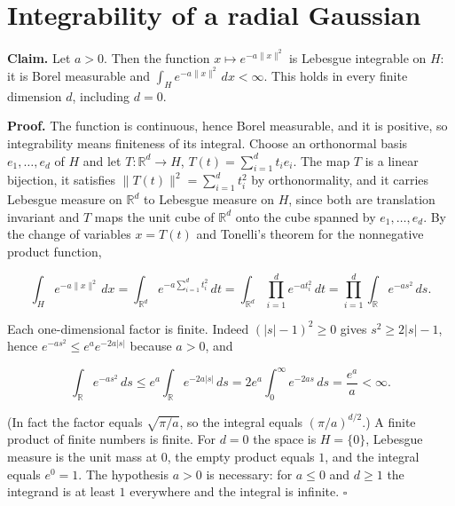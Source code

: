 \documentclass[11pt,a4paper]{article}
\begin{document}
\section{\texorpdfstring{Integrability of a radial Gaussian}{Integrability of a radial Gaussian}}


\textbf{Claim.} Let \(a>0\). Then the function \(x\mapsto e^{-a\|x\|^2}\) is Lebesgue integrable on \(H\): it is Borel measurable and \(\int_He^{-a\|x\|^2}\,dx<\infty\). This holds in every finite dimension \(d\), including \(d=0\).




\textbf{Proof.} The function is continuous, hence Borel measurable, and it is positive, so integrability means finiteness of its integral. Choose an orthonormal basis \(e_1,\dots,e_d\) of \(H\) and let \(T:\mathbb R^d\to H\), \(T(t)=\sum_{i=1}^dt_ie_i\). The map \(T\) is a linear bijection, it satisfies \(\|T(t)\|^2=\sum_{i=1}^dt_i^2\) by orthonormality, and it carries Lebesgue measure on \(\mathbb R^d\) to Lebesgue measure on \(H\), since both are translation invariant and \(T\) maps the unit cube of \(\mathbb R^d\) onto the cube spanned by \(e_1,\dots,e_d\). By the change of variables \(x=T(t)\) and Tonelli's theorem for the nonnegative product function,


\[\int_He^{-a\|x\|^2}\,dx=\int_{\mathbb R^d}e^{-a\sum_{i=1}^dt_i^2}\,dt=\int_{\mathbb R^d}\prod_{i=1}^de^{-at_i^2}\,dt=\prod_{i=1}^d\int_{\mathbb R}e^{-as^2}\,ds.\]


Each one-dimensional factor is finite. Indeed \((|s|-1)^2\ge0\) gives \(s^2\ge2|s|-1\), hence \(e^{-as^2}\le e^{a}e^{-2a|s|}\) because \(a>0\), and


\[\int_{\mathbb R}e^{-as^2}\,ds\le e^{a}\int_{\mathbb R}e^{-2a|s|}\,ds=2e^a\int_0^\infty e^{-2as}\,ds=\frac{e^a}{a}<\infty.\]


(In fact the factor equals \(\sqrt{\pi/a}\), so the integral equals \((\pi/a)^{d/2}\).) A finite product of finite numbers is finite. For \(d=0\) the space is \(H=\{0\}\), Lebesgue measure is the unit mass at \(0\), the empty product equals \(1\), and the integral equals \(e^{0}=1\). The hypothesis \(a>0\) is necessary: for \(a\le0\) and \(d\ge1\) the integrand is at least \(1\) everywhere and the integral is infinite. \(\square\)
\end{document}
